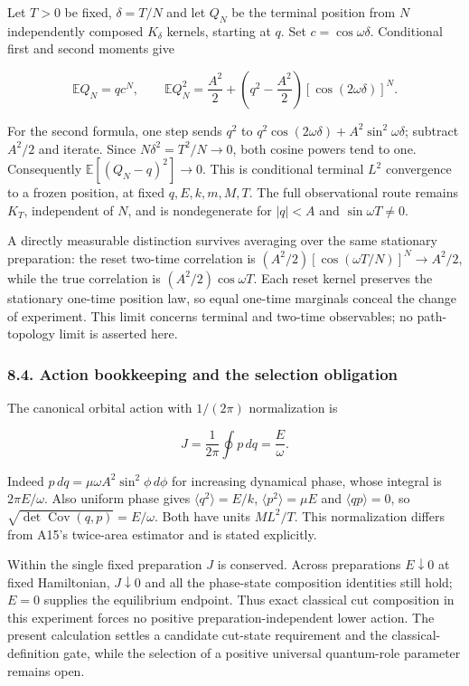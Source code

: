 \documentclass[11pt,a4paper]{article}
\begin{document}
Let \(T>0\) be fixed, \(\delta=T/N\) and let \(Q_N\) be the terminal
position from \(N\) independently composed \(K_\delta\) kernels,
starting at \(q\). Set \(c=\cos\omega\delta\). Conditional first and
second moments give

\[\mathbb E Q_N=q c^N,\qquad
\mathbb E Q_N^2=\frac{A^2}{2}
 +\left(q^2-\frac{A^2}{2}\right)[\cos(2\omega\delta)]^N.\]

For the second formula, one step sends \(q^2\) to
\(q^2\cos(2\omega\delta)+A^2\sin^2\omega\delta\); subtract \(A^2/2\) and
iterate. Since \(N\delta^2=T^2/N\to0\), both cosine powers tend to one.
Consequently \(\mathbb E[(Q_N-q)^2]\to0\). This is conditional terminal
\(L^2\) convergence to a frozen position, at fixed \(q,E,k,m,M,T\). The
full observational route remains \(K_T\), independent of \(N\), and is
nondegenerate for \(|q|<A\) and \(\sin\omega T\ne0\).

A directly measurable distinction survives averaging over the same
stationary preparation: the reset two-time correlation is
\((A^2/2)[\cos(\omega T/N)]^N\to A^2/2\), while the true correlation is
\((A^2/2)\cos\omega T\). Each reset kernel preserves the stationary
one-time position law, so equal one-time marginals conceal the change of
experiment. This limit concerns terminal and two-time observables; no
path-topology limit is asserted here.

\hypertarget{action-bookkeeping-and-the-selection-obligation}{%
\subsubsection{8.4. Action bookkeeping and the selection
obligation}\label{action-bookkeeping-and-the-selection-obligation}}

The canonical orbital action with \(1/(2\pi)\) normalization is

\[J=\frac1{2\pi}\oint p\,dq=\frac E\omega.\]

Indeed \(p\,dq=\mu\omega A^2\sin^2\phi\,d\phi\) for increasing dynamical
phase, whose integral is \(2\pi E/\omega\). Also uniform phase gives
\(\langle q^2\rangle=E/k\), \(\langle p^2\rangle=\mu E\) and
\(\langle qp\rangle=0\), so
\(\sqrt{\det\operatorname{Cov}(q,p)}=E/\omega\). Both have units
\(ML^2/T\). This normalization differs from A15's twice-area estimator
and is stated explicitly.

Within the single fixed preparation \(J\) is conserved. Across
preparations \(E\downarrow0\) at fixed Hamiltonian, \(J\downarrow0\) and
all the phase-state composition identities still hold; \(E=0\) supplies
the equilibrium endpoint. Thus exact classical cut composition in this
experiment forces no positive preparation-independent lower action. The
present calculation settles a candidate cut-state requirement and the
classical-definition gate, while the selection of a positive universal
quantum-role parameter remains open.
\end{document}
